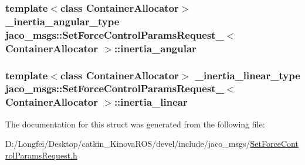 \subsubsection[{\texorpdfstring{inertia\+\_\+angular}{inertia_angular}}]{\setlength{\rightskip}{0pt plus 5cm}template$<$class Container\+Allocator$>$ {\bf \+\_\+inertia\+\_\+angular\+\_\+type} {\bf jaco\+\_\+msgs\+::\+Set\+Force\+Control\+Params\+Request\+\_\+}$<$ Container\+Allocator $>$\+::inertia\+\_\+angular}\hypertarget{structjaco__msgs_1_1SetForceControlParamsRequest___aee7ba36455fcb2b5ea168a5bf6331b7b}{}\label{structjaco__msgs_1_1SetForceControlParamsRequest___aee7ba36455fcb2b5ea168a5bf6331b7b}
\subsubsection[{\texorpdfstring{inertia\+\_\+linear}{inertia_linear}}]{\setlength{\rightskip}{0pt plus 5cm}template$<$class Container\+Allocator$>$ {\bf \+\_\+inertia\+\_\+linear\+\_\+type} {\bf jaco\+\_\+msgs\+::\+Set\+Force\+Control\+Params\+Request\+\_\+}$<$ Container\+Allocator $>$\+::inertia\+\_\+linear}\hypertarget{structjaco__msgs_1_1SetForceControlParamsRequest___a1163bd5470638964c3bd0f3146617695}{}\label{structjaco__msgs_1_1SetForceControlParamsRequest___a1163bd5470638964c3bd0f3146617695}


The documentation for this struct was generated from the following file\+:\begin{DoxyCompactItemize}
\item 
D\+:/\+Longfei/\+Desktop/catkin\+\_\+\+Kinova\+R\+O\+S/devel/include/jaco\+\_\+msgs/\hyperlink{SetForceControlParamsRequest_8h}{Set\+Force\+Control\+Params\+Request.\+h}\end{DoxyCompactItemize}
